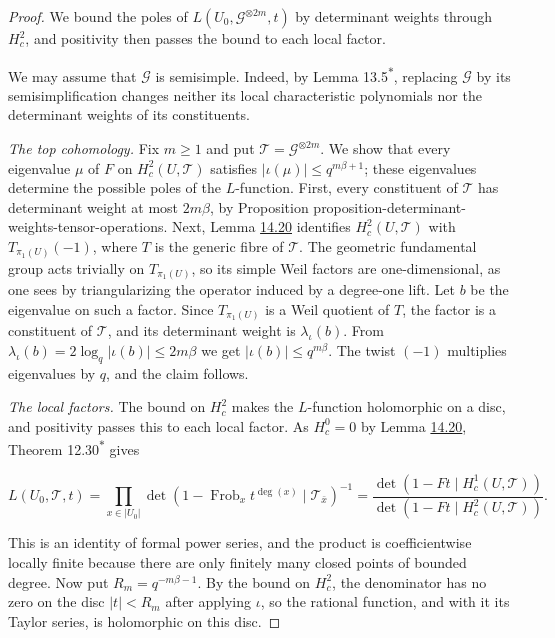\documentclass[11pt]{article}
\newcommand{\bpout}[1]{#1\textsuperscript{\hyperlink{bp-outside}{\ensuremath{\ast}}}}
\begin{document}
\begin{proof}[{Proof}]\label{bp79}%
We bound the poles of \(L(U_0,\mathcal G^{\otimes2m},t)\) by determinant weights through \(H^2_c\), and positivity then passes the bound to each local factor.

We may assume that \(\mathcal G\) is semisimple. Indeed, by Lemma \bpout{13.5}, replacing \(\mathcal G\) by its semisimplification changes neither its local characteristic polynomials nor the determinant weights of its constituents.

\emph{The top cohomology.} Fix \(m\ge1\) and put \(\mathcal T=\mathcal G^{\otimes2m}\). We show that every eigenvalue \(\mu\) of \(F\) on \(H_c^2(U,\mathcal T)\) satisfies \(|\iota(\mu)|\le q^{m\beta+1}\); these eigenvalues determine the possible poles of the \(L\)-function. First, every constituent of \(\mathcal T\) has determinant weight at most \(2m\beta\), by Proposition proposition-determinant-weights-tensor-operations. Next, Lemma \hyperref[bp66]{14.20} identifies \(H_c^2(U,\mathcal T)\) with \(T_{\pi_1(U)}(-1)\), where \(T\) is the generic fibre of \(\mathcal T\). The geometric fundamental group acts trivially on \(T_{\pi_1(U)}\), so its simple Weil factors are one-dimensional, as one sees by triangularizing the operator induced by a degree-one lift. Let \(b\) be the eigenvalue on such a factor. Since \(T_{\pi_1(U)}\) is a Weil quotient of \(T\), the factor is a constituent of \(\mathcal T\), and its determinant weight is \(\lambda_\iota(b)\). From \(\lambda_\iota(b)=2\log_q|\iota(b)|\le2m\beta\) we get \(|\iota(b)|\le q^{m\beta}\). The twist \((-1)\) multiplies eigenvalues by \(q\), and the claim follows.

\emph{The local factors.} The bound on \(H^2_c\) makes the \(L\)-function holomorphic on a disc, and positivity passes this to each local factor. As \(H_c^0=0\) by Lemma \hyperref[bp66]{14.20}, Theorem \bpout{12.30} gives

\[
L(U_0,\mathcal T,t)
=\prod_{x\in|U_0|}\det(1-\operatorname{Frob}_x t^{\deg(x)}\mid\mathcal T_{\bar x})^{-1}
=\frac{\det(1-Ft\mid H_c^1(U,\mathcal T))}
{\det(1-Ft\mid H_c^2(U,\mathcal T))}.
\]

This is an identity of formal power series, and the product is coefficientwise locally finite because there are only finitely many closed points of bounded degree. Now put \(R_m=q^{-m\beta-1}\). By the bound on \(H_c^2\), the denominator has no zero on the disc \(|t|<R_m\) after applying \(\iota\), so the rational function, and with it its Taylor series, is holomorphic on this disc.


\end{proof}
\end{document}
